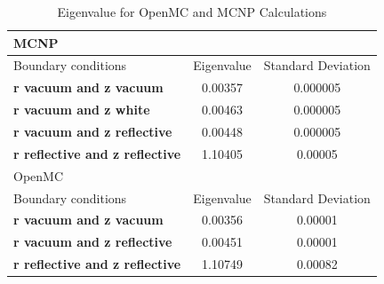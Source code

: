 \begin{table}
  \centering
  \begin{tabular}{|lcc|}
    \hline \hline
    MCNP &  & \\
    \hline
    Boundary conditions & Eigenvalue & Standard Deviation \\
    \hline
    \textbf{r vacuum and z vacuum}         & 0.00357 & 0.000005 \\
    \textbf{r vacuum and z white}	         & 0.00463 & 0.000005 \\
    \textbf{r vacuum  and z reflective}    & 0.00448 & 0.000005 \\
    \textbf{r reflective and z reflective} & 1.10405 & 0.00005  \\
    \hline \hline
    OpenMC & & \\
    \hline
    Boundary conditions & Eigenvalue & Standard Deviation\\
    \hline
    \textbf{r vacuum and z vacuum}         & 0.00356 & 0.00001 \\
    \textbf{r vacuum  and z reflective}    & 0.00451 & 0.00001 \\
    \textbf{r reflective and z reflective} & 1.10749 & 0.00082 \\
    \hline \hline
  \end{tabular}
  \caption{Eigenvalue for OpenMC and MCNP Calculations}
  \label{tab:eigen}
\end{table}
